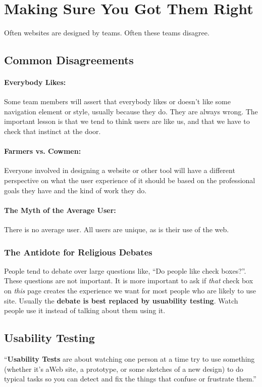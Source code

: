 \documentclass{article}%
\begin{document}
%
\section{Making Sure You Got Them Right}%
\label{sec:Making Sure You Got Them Right}%
  Often websites are designed by teams. Often these teams
  disagree.
  \subsection{Common Disagreements}
    \paragraph{Everybody Likes:}
      Some team members will assert that everybody likes or doesn't like some
      navigation element or style, usually because they do. They are always wrong.
      The important lesson is that we tend to think users are like us, and that we
      have to check that instinct at the door.
    \paragraph{Farmers vs. Cowmen:}
      Everyone involved in designing a website or other tool will have a different
      perspective on what the user experience of it should be based on the professional
      goals they have and the kind of work they do.
    \paragraph{The Myth of the Average User:}
      There is no average user. All users are unique, as is their use of the web.
  \subsubsection{The Antidote for Religious Debates}
    People tend to debate over large questions like, ``Do people like check boxes?''.
    These questions are not important. It is more important to ask if \emph{that} check box
    on \emph{this} page creates the experience we want for most people who are likely to use
     site. Usually the \textbf{debate is best replaced by usuability testing}. Watch
    people use it instead of talking about them using it.
  \subsection{Usability Testing}
    ``\textbf{Usability Tests} are about watching one person at a time try to use something (whether it’s aWeb site, a prototype, or some sketches of a new design) to do typical tasks so you can detect
and fix the things that confuse or frustrate them.''
\end{document}
